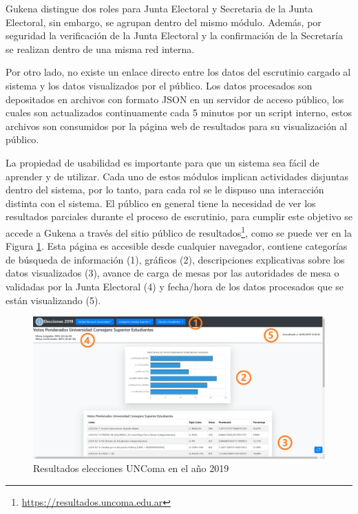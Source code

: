 Gukena distingue dos roles para Junta Electoral y Secretaria de la Junta Electoral, sin embargo, se agrupan dentro del mismo módulo. Además, por seguridad la verificación de la Junta Electoral y la confirmación de la Secretaría se realizan dentro de una misma red interna.

Por otro lado, no existe un enlace directo entre los datos del escrutinio cargado al sistema y los datos visualizados por el público. Los datos procesados son depositados en archivos con formato JSON en un servidor de acceso público, los cuales son actualizados continuamente cada 5 minutos por un script interno, estos archivos son consumidos por la página web de resultados para su visualización al público.

La propiedad de usabilidad es importante para que un sistema sea fácil de aprender y de utilizar. Cada uno de estos módulos implican actividades disjuntas dentro del sistema, por lo tanto, para cada rol se le dispuso una interacción distinta con el sistema. \newline
El público en general tiene la necesidad de ver los resultados parciales durante el proceso de escrutinio, para cumplir este objetivo se accede a Gukena a través del sitio público de resultados\footnote{\url{https://resultados.uncoma.edu.ar}}, como se puede ver en la Figura \ref{graf:gukena2019}.
Esta página es accesible desde cualquier navegador, contiene categorías de búsqueda de información (1), gráficos (2), descripciones explicativas sobre los datos visualizados (3), avance de carga de mesas por las autoridades de mesa o validadas por la Junta Electoral (4) y fecha/hora de los datos procesados que se están visualizando (5). 

\begin{figure}[h!]
  \includegraphics[width=\textwidth]{img/resultados_tags.png}
  \caption{Resultados elecciones UNComa en el año 2019}
  \label{graf:gukena2019}
\end{figure}

